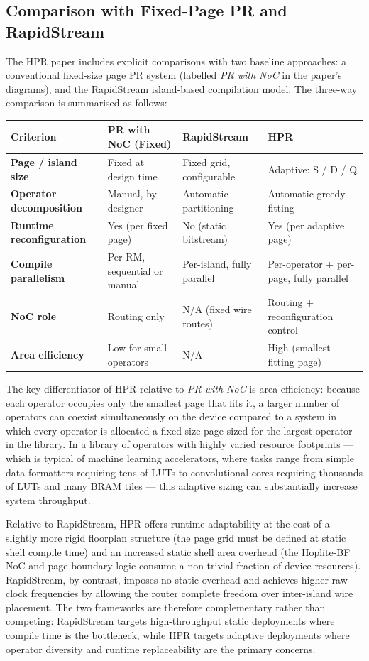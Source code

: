 \subsection{Comparison with Fixed-Page PR and RapidStream}

The HPR paper includes explicit comparisons with two baseline approaches: a conventional fixed-size page PR system (labelled \textit{PR with NoC} in the paper's diagrams), and the RapidStream island-based compilation model. The three-way comparison is summarised as follows:

\begin{table}[htbp]
\centering
\begin{tabularx}{\textwidth}{X X X X}
\toprule
Criterion & PR with NoC (Fixed) & RapidStream & HPR \\
\midrule
\textbf{Page / island size} & Fixed at design time & Fixed grid, configurable & Adaptive: S / D / Q \\
\textbf{Operator decomposition} & Manual, by designer & Automatic partitioning & Automatic greedy fitting \\
\textbf{Runtime reconfiguration} & Yes (per fixed page) & No (static bitstream) & Yes (per adaptive page) \\
\textbf{Compile parallelism} & Per-RM, sequential or manual & Per-island, fully parallel & Per-operator + per-page, fully parallel \\
\textbf{NoC role} & Routing only & N/A (fixed wire routes) & Routing + reconfiguration control \\
\textbf{Area efficiency} & Low for small operators & N/A & High (smallest fitting page) \\
\bottomrule
\end{tabularx}
\end{table}

The key differentiator of HPR relative to \textit{PR with NoC} is area efficiency: because each operator occupies only the smallest page that fits it, a larger number of operators can coexist simultaneously on the device compared to a system in which every operator is allocated a fixed-size page sized for the largest operator in the library. In a library of operators with highly varied resource footprints — which is typical of machine learning accelerators, where tasks range from simple data formatters requiring tens of LUTs to convolutional cores requiring thousands of LUTs and many BRAM tiles — this adaptive sizing can substantially increase system throughput.

Relative to RapidStream, HPR offers runtime adaptability at the cost of a slightly more rigid floorplan structure (the page grid must be defined at static shell compile time) and an increased static shell area overhead (the Hoplite-BF NoC and page boundary logic consume a non-trivial fraction of device resources). RapidStream, by contrast, imposes no static overhead and achieves higher raw clock frequencies by allowing the router complete freedom over inter-island wire placement. The two frameworks are therefore complementary rather than competing: RapidStream targets high-throughput static deployments where compile time is the bottleneck, while HPR targets adaptive deployments where operator diversity and runtime replaceability are the primary concerns.

